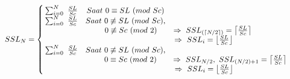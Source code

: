 \begin{equation}\label{eq:sub_enemy_levels1}
\resizebox{\columnwidth}{!}{%
	$SSL_{N} = \left\{\begin{matrix}
	\hspace{0.2em} \sum_{i = 0}^{N}\ \frac{SL}{Sc} & Saat\ 0 \equiv SL\ (mod\ Sc) & \\
	
	\hspace{0.2em} \sum_{i = 0}^{N}\ \frac{SL}{Sc} & Saat\ 0 \not\equiv SL\ (mod\ Sc), & \\
	&\hspace{1.4em}  0 \not\equiv Sc\ (mod\ 2) & \hspace{-4.5em} \Rightarrow\ SSL_{(\left \lceil N/2 \right \rceil)}  = \left \lceil \frac{SL}{Sc} \right \rceil &\\
	
	& & \hspace{-6.8em} \Rightarrow\ SSL_{i}  = \left \lfloor \frac{SL}{Sc} \right \rfloor &\\
	
	\hspace{0.2em} \sum_{i = 0}^{N}\ \frac{SL}{Sc} & Saat\ 0 \not\equiv SL\ (mod\ Sc), & \\
	&\hspace{1.3em}  0 \equiv Sc\ (mod\ 2) & \Rightarrow\ SSL_{N/2},\ SSL_{(N/2) + 1}  = \left \lceil \frac{SL}{Sc} \right \rceil &\\
	
	& & \hspace{-6.7em} \Rightarrow\ SSL_{i}  = \left \lfloor \frac{SL}{Sc} \right \rfloor &\\
	\end{matrix}\right.$%
}
\end{equation}

